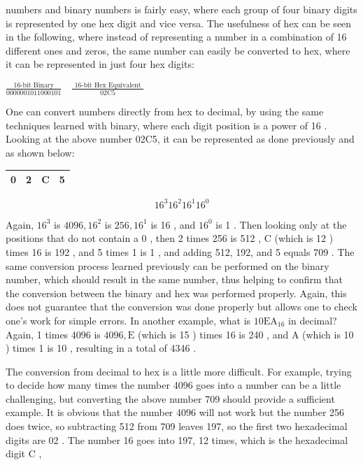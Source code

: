 \documentclass[10pt]{book}
\begin{document}
numbers and binary numbers is fairly easy, where each group of four binary digits is represented by one hex digit and vice versa. The usefulness of hex can be seen in the following, where instead of representing a number in a combination of 16 different ones and zeros, the same number can easily be converted to hex, where it can be represented in just four hex digits:

$\frac{\text { 16-bit Binary }}{0000001011000101} \quad \frac{\text { 16-bit Hex Equivalent }}{02 \mathrm{C} 5}$

One can convert numbers directly from hex to decimal, by using the same techniques learned with binary, where each digit position is a power of 16 . Looking at the above number 02C5, it can be represented as done previously and as shown below:

\begin{center}
\begin{tabular}{|l|l|l|l|}
\hline
0 & 2 & C & 5 \\
\hline
\end{tabular}
\end{center}

$$
16^{3} 16^{2} 16^{1} 16^{0}
$$

Again, $16^{3}$ is $4096,16^{2}$ is $256,16^{1}$ is 16 , and $16^{0}$ is 1 . Then looking only at the positions that do not contain a 0 , then 2 times 256 is 512 , C (which is 12 ) times 16 is 192 , and 5 times 1 is 1 , and adding 512, 192, and 5 equals 709 . The same conversion process learned previously can be performed on the binary number, which should result in the same number, thus helping to confirm that the conversion between the binary and hex was performed properly. Again, this does not guarantee that the conversion was done properly but allows one to check one's work for simple errors. In another example, what is $10 \mathrm{EA}_{16}$ in decimal? Again, 1 times 4096 is $4096, \mathrm{E}$ (which is 15 ) times 16 is 240 , and A (which is 10 ) times 1 is 10 , resulting in a total of 4346 .

The conversion from decimal to hex is a little more difficult. For example, trying to decide how many times the number 4096 goes into a number can be a little challenging, but converting the above number 709 should provide a sufficient example. It is obvious that the number 4096 will not work but the number 256 does twice, so subtracting 512 from 709 leaves 197, so the first two hexadecimal digits are 02 . The number 16 goes into 197, 12 times, which is the hexadecimal digit C ,
\end{document}
